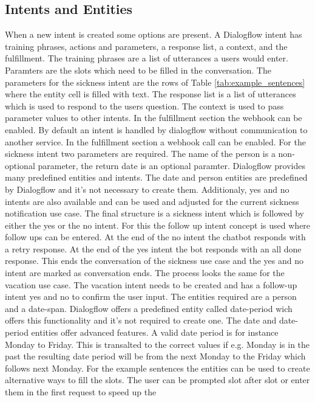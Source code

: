 \subsection{Intents and Entities}
When a new intent is created some options are present.
A Dialogflow intent has training phrases, actions and parameters,
a response list, a context, and the fulfillment.
The training phrases are a list of utterances a users would enter.
Paramters are the slots which need to be filled in the conversation.
The parameters for the sickness intent are the rows of Table \ref{tab:example_sentences} where the entity cell is 
filled with text.
The response list is a list of utterances which is used to respond to the users question.
The context is used to pass parameter values to other intents.
In the fulfillment section the webhook can be enabled.
By default an intent is handled by dialogflow without communication to another service.
In the fulfillment section a webhook call can be enabled.
For the sickness intent two parameters are required.
The name of the person is a non-optional parameter,
the return date is an optional paramter.
Dialogflow provides many predefined entities and intents.
The date and person entities are predefined by Dialogflow and it's 
not necessary to create them.
Additionaly, yes and no intents are also available and can be used and 
adjusted for the current sickness notification use case.
The final structure is a sickness intent which is followed by either 
the yes or the no intent.
For this the follow up intent concept is used where follow ups can 
be entered.
At the end of the no intent the chatbot responds with a retry response.
At the end of the yes intent the bot responds with an all done response.
This ends the conversation of the sickness use case and the yes and no 
intent are marked as conversation ends.
The process looks the same for the vacation use case.
The vacation intent needs to be created and has a follow-up intent 
yes and no to confirm the user input.
The entities required are a person and a date-span.
Dialogflow offers a predefined entity called date-period wich offers this 
functionality and it's not required to create one.
The date and date-period entities offer advanced features.
A valid date period is for instance Monday to Friday.
This is transalted to the correct values if e.g. Monday is in the past
the resulting date period will be from the next Monday to the Friday 
which follows next Monday.
For the example sentences the entities can be used to create alternative ways to fill the slots.
The user can be prompted slot after slot or enter them in the first request to speed up the 
